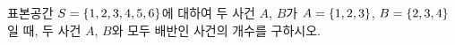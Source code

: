 표본공간 $S=\{1{,}\mkern3mu\mathopen{}2{,}\mkern3mu\mathopen{}3{,}\mkern3mu\mathopen{}4{,}\mkern3mu\mathopen{}5{,}\mkern3mu\mathopen{}6\}$에 대하여 두 사건 $A$, $B$가 $A=\{1{,}\mkern3mu\mathopen{}2{,}\mkern3mu\mathopen{}3\}$, $B=\{2{,}\mkern3mu\mathopen{}3{,}\mkern3mu\mathopen{}4\}$일 때, 두 사건 $A$, $B$와 모두 배반인 사건의 개수를 구하시오.
